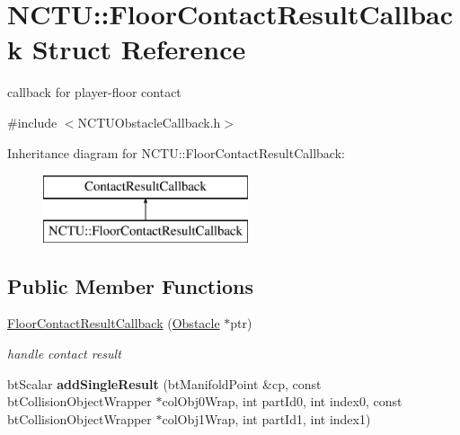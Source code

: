 \hypertarget{struct_n_c_t_u_1_1_floor_contact_result_callback}{}\section{N\+C\+TU\+:\+:Floor\+Contact\+Result\+Callback Struct Reference}
\label{struct_n_c_t_u_1_1_floor_contact_result_callback}


callback for player-\/floor contact  




{\ttfamily \#include $<$N\+C\+T\+U\+Obstacle\+Callback.\+h$>$}

Inheritance diagram for N\+C\+TU\+:\+:Floor\+Contact\+Result\+Callback\+:\begin{figure}[H]
\begin{center}
\leavevmode
\includegraphics[height=2.000000cm]{struct_n_c_t_u_1_1_floor_contact_result_callback}
\end{center}
\end{figure}
\subsection*{Public Member Functions}
\begin{DoxyCompactItemize}
\item 
\hyperlink{struct_n_c_t_u_1_1_floor_contact_result_callback_a837efd6e0899096a004133dd526084bd}{Floor\+Contact\+Result\+Callback} (\hyperlink{class_n_c_t_u_1_1_obstacle}{Obstacle} $\ast$ptr)\hypertarget{struct_n_c_t_u_1_1_floor_contact_result_callback_a837efd6e0899096a004133dd526084bd}{}\label{struct_n_c_t_u_1_1_floor_contact_result_callback_a837efd6e0899096a004133dd526084bd}

\begin{DoxyCompactList}\small\item\em handle contact result \end{DoxyCompactList}\item 
bt\+Scalar {\bfseries add\+Single\+Result} (bt\+Manifold\+Point \&cp, const bt\+Collision\+Object\+Wrapper $\ast$col\+Obj0\+Wrap, int part\+Id0, int index0, const bt\+Collision\+Object\+Wrapper $\ast$col\+Obj1\+Wrap, int part\+Id1, int index1)\hypertarget{struct_n_c_t_u_1_1_floor_contact_result_callback_af6e9cbd28d3ea79f9719c0d023f9dc09}{}\label{struct_n_c_t_u_1_1_floor_contact_result_callback_af6e9cbd28d3ea79f9719c0d023f9dc09}

\end{DoxyCompactItemize}
